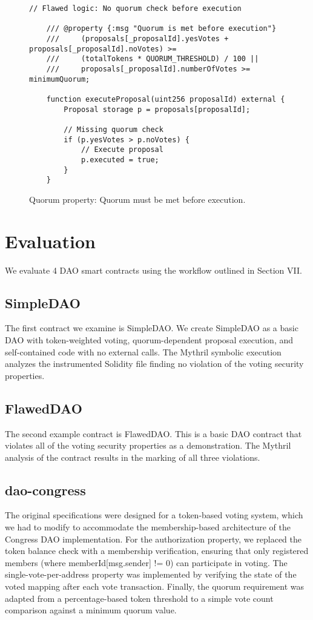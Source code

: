 \documentclass[conference]{IEEEtran}
\begin{document}
\begin{figure}[h]
\centering
\begin{lstlisting}[basicstyle=\ttfamily\small,breaklines=true]
    // Flawed logic: No quorum check before execution
    
    /// @property {:msg "Quorum is met before execution"} 
    ///     (proposals[_proposalId].yesVotes + proposals[_proposalId].noVotes) >= 
    ///     (totalTokens * QUORUM_THRESHOLD) / 100 || 
    ///     proposals[_proposalId].numberOfVotes >= minimumQuorum;
    
    function executeProposal(uint256 proposalId) external {
        Proposal storage p = proposals[proposalId];
        
        // Missing quorum check
        if (p.yesVotes > p.noVotes) {
            // Execute proposal
            p.executed = true;
        }
    }
\end{lstlisting}
\caption{Quorum property: Quorum must be met before execution.}
\label{fig:quorum_property}
\end{figure}
\section{Evaluation}
We evaluate 4 DAO smart contracts using the workflow outlined in Section VII. 
\subsection{SimpleDAO} The first contract we examine is SimpleDAO. We create SimpleDAO as a basic DAO with token-weighted voting, quorum-dependent proposal execution, and self-contained code with no external calls. The Mythril symbolic execution analyzes the instrumented Solidity file finding no violation of the voting security properties.
\subsection{FlawedDAO} The second example contract is FlawedDAO. This is a basic DAO contract that violates all of the voting security properties as a demonstration. The Mythril analysis of the contract results in the marking of all three violations.
\subsection{dao-congress} The original specifications were designed for a token-based voting system, which we had to modify to accommodate the membership-based architecture of the Congress DAO implementation. For the authorization property, we replaced the token balance check with a membership verification, ensuring that only registered members (where memberId[msg.sender] != 0) can participate in voting. The single-vote-per-address property was implemented by verifying the state of the voted mapping after each vote transaction. Finally, the quorum requirement was adapted from a percentage-based token threshold to a simple vote count comparison against a minimum quorum value. 
\end{document}
